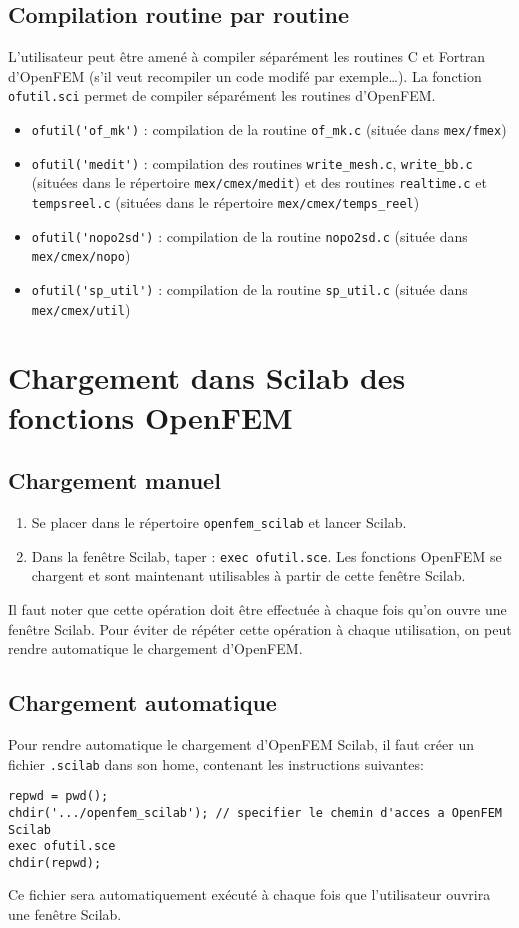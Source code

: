 \documentclass[a4paper]{article}
\begin{document}
\subsection{Compilation routine par routine}
L'utilisateur peut \^etre amen\'e \`a compiler s\'epar\'ement les routines C et Fortran d'OpenFEM (s'il veut recompiler un code modif\'e par exemple\ldots). La fonction \verb+ofutil.sci+ permet de compiler s\'epar\'ement les routines d'OpenFEM.
\begin{itemize}
\item \verb+ofutil('of_mk')+ : compilation de la routine \verb+of_mk.c+ (situ\'ee dans \verb+mex/fmex+)
\item \verb+ofutil('medit')+ : compilation des routines \verb+write_mesh.c+, \verb+write_bb.c+ (situ\'ees dans le r\'epertoire \verb+mex/cmex/medit+) et des routines \verb+realtime.c+ et \verb+tempsreel.c+ (situ\'ees dans le r\'epertoire \verb+mex/cmex/temps_reel+) 
\item \verb+ofutil('nopo2sd')+ : compilation de la routine \verb+nopo2sd.c+ (situ\'ee dans \verb+mex/cmex/nopo+)
\item \verb+ofutil('sp_util')+ : compilation de la routine \verb+sp_util.c+ (situ\'ee dans \verb+mex/cmex/util+)
\end{itemize}

\section{Chargement dans Scilab des fonctions OpenFEM}
\subsection{Chargement manuel}
\begin{enumerate}
\item Se placer dans le r\'epertoire \verb+openfem_scilab+ et lancer Scilab.
\item Dans la fen\^etre Scilab, taper : \verb+exec ofutil.sce+. Les fonctions OpenFEM se chargent et sont maintenant utilisables \`a partir de cette fen\^etre Scilab.
\end{enumerate}
Il faut noter que cette op\'eration doit \^etre effectu\'ee \`a chaque fois qu'on ouvre une fen\^etre Scilab. Pour \'eviter de r\'ep\'eter cette op\'eration \`a chaque utilisation, on peut rendre automatique le chargement d'OpenFEM.
\subsection{Chargement automatique}
Pour rendre automatique le chargement d'OpenFEM Scilab, il faut cr\'eer un fichier \verb+.scilab+ dans son home, contenant les instructions suivantes:\\
\begin{verbatim}
repwd = pwd();
chdir('.../openfem_scilab'); // specifier le chemin d'acces a OpenFEM Scilab  
exec ofutil.sce
chdir(repwd);
\end{verbatim}
Ce fichier sera automatiquement ex\'ecut\'e \`a chaque fois que l'utilisateur ouvrira une fen\^etre Scilab.
\end{document}
